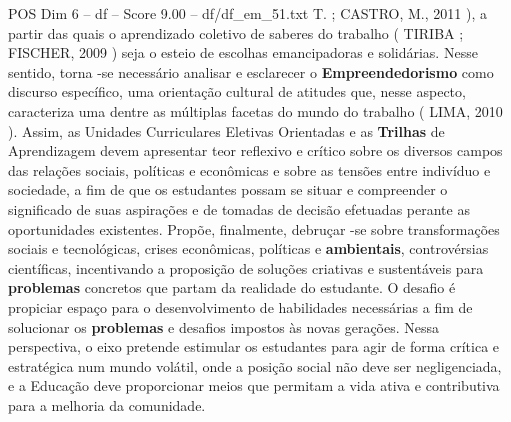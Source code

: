 \begin{textsample}{POS Dim 6 – df – Score 9.00 – df/df\_em\_51.txt}
T. ; CASTRO, M., 2011 ), a partir das quais o aprendizado coletivo de saberes do trabalho ( TIRIBA ; FISCHER, 2009 ) seja o esteio de escolhas emancipadoras e solidárias.
Nesse sentido, torna -se necessário analisar e esclarecer o \textbf{Empreendedorismo} como discurso específico, uma orientação cultural de atitudes que, nesse aspecto, caracteriza uma dentre as múltiplas facetas do mundo do trabalho ( LIMA, 2010 ).
Assim, as Unidades Curriculares Eletivas Orientadas e as \textbf{Trilhas} de Aprendizagem devem apresentar teor reflexivo e crítico sobre os diversos campos das relações sociais, políticas e econômicas e sobre as tensões entre indivíduo e sociedade, a fim de que os estudantes possam se situar e compreender o significado de suas aspirações e de tomadas de decisão efetuadas perante as oportunidades existentes.
Propõe, finalmente, debruçar -se sobre transformações sociais e tecnológicas, crises econômicas, políticas e \textbf{ambientais}, controvérsias científicas, incentivando a proposição de soluções criativas e sustentáveis para \textbf{problemas} concretos que partam da realidade do estudante.
O desafio é propiciar espaço para o desenvolvimento de habilidades necessárias a fim de solucionar os \textbf{problemas} e desafios impostos às novas gerações.
Nessa perspectiva, o eixo pretende estimular os estudantes para agir de forma crítica e estratégica num mundo volátil, onde a posição social não deve ser negligenciada, e a Educação deve proporcionar meios que permitam a vida ativa e contributiva para a melhoria da comunidade.

\end{textsample}
